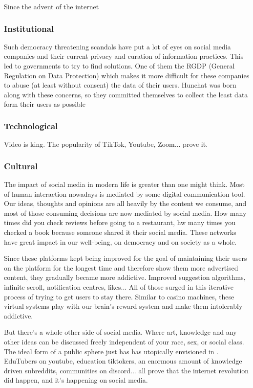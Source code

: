 \documentclass[12pt]{article}
\begin{document}
	Since the advent of the internet
		
	\subsubsection{Institutional}
	Such democracy threatening scandals have put a lot of eyes on social media companies and their current privacy and curation of information practices. This led to governments to try to find solutions. One of them the RGDP (General Regulation on Data Protection) which makes it more difficult for these companies to abuse (at least without consent) the data of their users. Hunchat was born along with these concerns, so they committed themselves to collect the least data form their users as possible
	
	\subsubsection{Technological}
	Video is king. The popularity of TikTok, Youtube, Zoom... prove it.
	
	\subsubsection{Cultural}
	The impact of social media in modern life is greater than one might think. Most of human interaction nowadays is mediated by some digital communication tool. Our ideas, thoughts and opinions are all heavily by the content we consume, and most of those consuming decisions are now mediated by social media. How many times did you check reviews before going to a restaurant, hw many times you checked a book because someone shared it their social media. These networks have great impact in our well-being, on democracy and on society as a whole.
	
	 Since these platforms kept being improved for the goal of maintaining their users on the platform for the longest time and therefore show them more advertised content, they gradually became more addictive. Improved suggestion algorithms, infinite scroll, notification centres, likes... All of those surged in this iterative process of trying to get users to stay there. Similar to casino machines, these virtual systems play with our brain's reward system and make them intolerably addictive. 
	 
	 But there's a whole other side of social media. Where art, knowledge and any other ideas can be discussed freely independent of your race, sex, or social class. The ideal form of a public sphere just has \citeauthor{habermas} has utopically envisioned in \citeyear{habermas}. EduTubers on youtube, education tiktokers, an enormous amount of knowledge driven subreddits, communities on discord... all prove that the internet revolution did happen, and it's happening on social media.
	 
\end{document}
